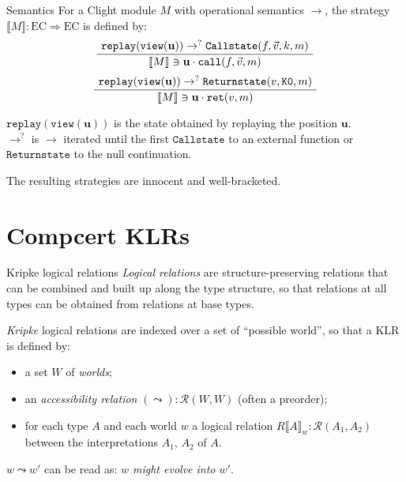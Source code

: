 \documentclass[handout]{beamer}
\newcommand{\EC}{\text{EC}}
\newcommand{\ECEC}{\EC \Rightarrow \EC}
\newcommand{\kw}[1]{\texttt{#1}}
\newcommand{\word}[1]{\mathbf{#1}}
\newcommand{\Y}{\mathbf{Y}}
\begin{document}
\begin{frame}{Semantics} %
For a Clight module $M$ with operational semantics $\rightarrow$,
the strategy $\llbracket M \rrbracket : \ECEC$ is defined by:
\[
	\AxiomC{$\kw{replay}(\kw{view}(\word{u}))
		\rightarrow^?
		\kw{Callstate}(f, \vec{v}, k, m)$}
	\UnaryInfC{$\llbracket M \rrbracket \ni
		\word{u} \cdot \kw{call}(f, \vec{v}, m)$}
	\DisplayProof
\]
\[
	\AxiomC{$\kw{replay}(\kw{view}(\word{u}))
		\rightarrow^?
		\kw{Returnstate}(v, \kw{K0}, m)$}
	\UnaryInfC{$\llbracket M \rrbracket \ni
		\word{u} \cdot \kw{ret}(v, m)$}
	\DisplayProof
\]

$\kw{replay}(\kw{view}(\word{u}))$ is the state obtained
by replaying the position $\word{u}$. \\
$\rightarrow^{?}$ is $\rightarrow$ iterated
until the first $\kw{Callstate}$ to an external function
or $\kw{Returnstate}$ to the null continuation.

The resulting strategies are innocent and well-bracketed.
\end{frame}

%

\section{Compcert KLRs}

\begin{frame}{Kripke logical relations} %
\emph{Logical relations} are structure-preserving relations
that can be combined and built up along the type structure,
so that relations at all types can be obtained
from relations at base types.

\emph{Kripke} logical relations
are indexed over a set of ``possible world'',
so that a KLR is defined by:
\begin{itemize}
\item a set $W$ of \emph{worlds};
\item an \emph{accessibility relation} $(\leadsto) : \mathcal{R}(W, W)$ (often a preorder);
\item for each type $A$ and each world $w$
  a logical relation $R \llbracket A \rrbracket_w : \mathcal{R}(A_1, A_2)$ between the interpretations
  $A_1$, $A_2$ of $A$.
\end{itemize}

$w \leadsto w'$ can be read as: \emph{$w$ might evolve into $w'$}.
\end{frame} %
\end{document}
